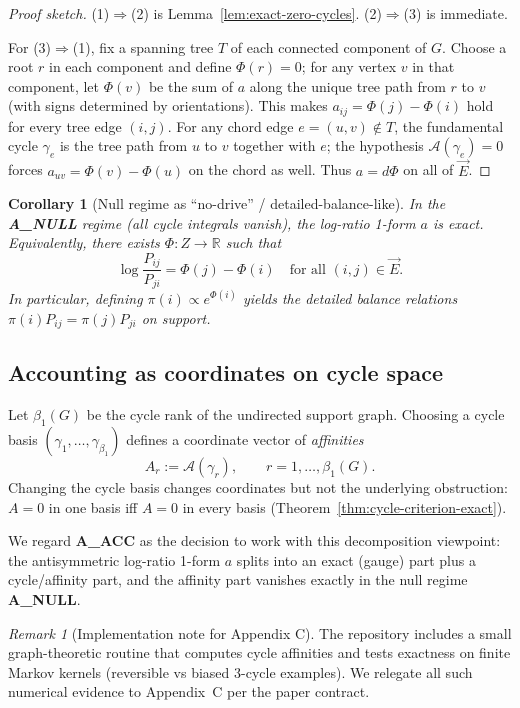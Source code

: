 \documentclass[11pt]{article}
\newtheorem{corollary}{Corollary}
\theoremstyle{remark}
\newtheorem{remark}{Remark}
\begin{document}
\begin{proof}[Proof sketch]
(1)$\Rightarrow$(2) is Lemma~\ref{lem:exact-zero-cycles}. (2)$\Rightarrow$(3) is immediate.

For (3)$\Rightarrow$(1), fix a spanning tree $T$ of each connected component of $G$.
Choose a root $r$ in each component and define $\Phi(r)=0$; for any vertex $v$ in that component,
let $\Phi(v)$ be the sum of $a$ along the unique tree path from $r$ to $v$ (with signs determined
by orientations).
This makes $a_{ij}=\Phi(j)-\Phi(i)$ hold for every tree edge $(i,j)$.
For any chord edge $e=(u,v)\notin T$, the fundamental cycle $\gamma_e$ is the tree path from $u$
to $v$ together with $e$; the hypothesis $\mathcal A(\gamma_e)=0$ forces $a_{uv}=\Phi(v)-\Phi(u)$
on the chord as well.
Thus $a=d\Phi$ on all of $\vec E$.
\end{proof}

\begin{corollary}[Null regime as ``no-drive'' / detailed-balance-like]
\label{cor:null-regime}
In the \textbf{A\_NULL} regime (all cycle integrals vanish), the log-ratio 1-form $a$ is exact.
Equivalently, there exists $\Phi:Z\to\mathbb R$ such that
\[
\log\frac{P_{ij}}{P_{ji}} = \Phi(j)-\Phi(i) \quad \text{for all } (i,j)\in \vec E.
\]
In particular, defining $\pi(i)\propto e^{\Phi(i)}$ yields the detailed balance relations
$\pi(i)P_{ij}=\pi(j)P_{ji}$ on support.
\end{corollary}

\subsection{Accounting as coordinates on cycle space}

Let $\beta_1(G)$ be the cycle rank of the undirected support graph.
Choosing a cycle basis $(\gamma_1,\dots,\gamma_{\beta_1})$ defines a coordinate vector of
\emph{affinities}
\[
A_r := \mathcal A(\gamma_r), \qquad r=1,\dots,\beta_1(G).
\]
Changing the cycle basis changes coordinates but not the underlying obstruction: $A=0$ in one
basis iff $A=0$ in every basis (Theorem~\ref{thm:cycle-criterion-exact}).

We regard \textbf{A\_ACC} as the decision to work with this decomposition viewpoint:
the antisymmetric log-ratio 1-form $a$ splits into an exact (gauge) part plus a cycle/affinity
part, and the affinity part vanishes exactly in the null regime \textbf{A\_NULL}.

\begin{remark}[Implementation note for Appendix C]
The repository includes a small graph-theoretic routine that computes cycle affinities and tests
exactness on finite Markov kernels (reversible vs biased 3-cycle examples). We relegate all such
numerical evidence to Appendix~C per the paper contract.
\end{remark}
\end{document}
